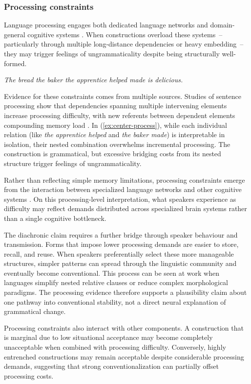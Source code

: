 \documentclass[12pt,letterpaper]{article}
\begin{document}
\subsubsection{Processing constraints}\label{sec:processing-constraints}

Language processing engages both dedicated language networks and domain-general cognitive systems \autocite{Fedorenko2024}. When constructions overload these systems~-- particularly through multiple long-distance dependencies or heavy embedding~-- they may trigger feelings of ungrammaticality despite being structurally well-formed.

\ea
\textit{The bread the baker the apprentice helped made is delicious.}\label{ex:center-process}
\z

Evidence for these constraints comes from multiple sources. Studies of sentence processing show that dependencies spanning multiple intervening elements increase processing difficulty, with new referents between dependent elements compounding memory load \autocite{gibson2000,gibson2026}. In (\ref{ex:center-process}), while each individual relation (like \textit{the apprentice helped} and \textit{the baker made}) is interpretable in isolation, their nested combination overwhelms incremental processing. The construction is grammatical, but excessive bridging costs from its nested structure trigger feelings of ungrammaticality.

Rather than reflecting simple memory limitations, processing constraints emerge from the interaction between specialized language networks and other cognitive systems \autocite{Fedorenko2024}. On this processing-level interpretation, what speakers experience as difficulty may reflect demands distributed across specialized brain systems rather than a single cognitive bottleneck.

The diachronic claim requires a further bridge through speaker behaviour and transmission. Forms that impose lower processing demands are easier to store, recall, and reuse. When speakers preferentially select these more manageable structures, simpler patterns can spread through the linguistic community and eventually become conventional. This process can be seen at work when languages simplify nested relative clauses or reduce complex morphological paradigms. The processing evidence therefore supports a plausibility claim about one pathway into conventional stability, not a direct neural explanation of grammatical change.

Processing constraints also interact with other components. A construction that is marginal due to low situational acceptance may become completely unacceptable when combined with processing difficulty. Conversely, highly entrenched constructions may remain acceptable despite considerable processing demands, suggesting that strong conventionalization can partially offset processing costs.
\end{document}
